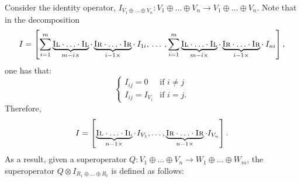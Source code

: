 Consider the identity operator, $I_{V_1 \oplus \ldots \oplus V_n}: V_1 \oplus \ldots \oplus V_n \rightarrow  V_1 \oplus \ldots \oplus V_n$. Note that in the decomposition 
$$I= \left[ \sum_{i=1}^{m} \underbrace{\textsc{Il} \cdot \ldots \cdot \textsc{Il}}_{m-i \times } \cdot  \underbrace{\textsc{Ir} \cdot \ldots \cdot \textsc{Ir}}_{i-1 \times } \cdot  \hspace{2pt} I_{1i},  \hspace{2pt} \ldots  \hspace{2pt}, \sum_{i=1}^{m} \underbrace{\textsc{Il} \cdot \ldots \cdot \textsc{Il}}_{m-i \times } \cdot  \underbrace{\textsc{Ir} \cdot \ldots \cdot \textsc{Ir}}_{i-1 \times } \cdot  \hspace{2pt} I_{ni}  \right],$$
one has that:
\begin{equation*}
  \begin{cases}
    I_{ij} = 0 & \text{if } i \neq j \\
    I_{ij} = I_{V_i} & \text{if } i = j.
  \end{cases}
\end{equation*}
Therefore,
 $$I = \left[\underbrace{\textsc{Il} \cdot \ldots \cdot \textsc{Il}}_{n-1 \times} \cdot \hspace{1pt}I_{V_1}, \ldots,  \underbrace{\textsc{Ir} \cdot \ldots \cdot \textsc{Ir}}_{n-1 \times} \cdot I_{V_n}\right].$$ 
 As a result, given a superoperator $Q: V_1 \oplus \ldots \oplus V_n \rightarrow W_1 \oplus \ldots \oplus W_m$, the superoperator $Q \otimes I_{R_1 \oplus \ldots \oplus R_t}$ is defined as follows:
